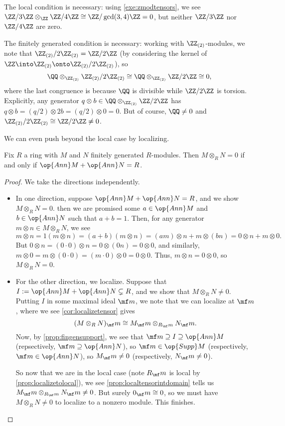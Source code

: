\begin{remark}[Nir]
	The local condition is necessary: using \autoref{exe:zmodtensors}, we see $\ZZ/3\ZZ\otimes_\ZZ\ZZ/4\ZZ\cong\ZZ/\gcd(3,4)\ZZ=0$, but neither $\ZZ/3\ZZ$ nor $\ZZ/4\ZZ$ are zero.
\end{remark}
\begin{remark}[Nir] \label{rem:fingentensordomain}
	The finitely generated condition is necessary: working with $\ZZ_{(2)}$-modules, we note that $\ZZ_{(2)}/2\ZZ_{(2)}=\ZZ/2\ZZ$ (by considering the kernel of $\ZZ\into\ZZ_{(2)}\onto\ZZ_{(2)}/2\ZZ_{(2)}$), so
	\[\QQ\otimes_{\ZZ_{(2)}}\ZZ_{(2)}/2\ZZ_{(2)}\cong\QQ\otimes_{\ZZ_{(2)}}\ZZ/2\ZZ\cong0,\]
	where the last congruence is because $\QQ$ is divisible while $\ZZ/2\ZZ$ is torsion. Explicitly, any generator $q\otimes b\in\QQ\otimes_{\ZZ_{(2)}}\ZZ/2\ZZ$ has $q\otimes b=(q/2)\otimes2b=(q/2)\otimes0=0$. But of course, $\QQ\ne0$ and $\ZZ_{(2)}/2\ZZ_{(2)}\cong\ZZ/2\ZZ\ne0$.
\end{remark}
We can even push beyond the local case by localizing.
\begin{corollary}
	Fix $R$ a ring with $M$ and $N$ finitely generated $R$-modules. Then $M\otimes_RN=0$ if and only if $\op{Ann}M+\op{Ann}N=R$.
\end{corollary}
\begin{proof}
	We take the directions independently.
	\begin{itemize}
		\item In one direction, suppose $\op{Ann}M+\op{Ann}N=R$, and we show $M\otimes_RN=0$. then we are promised some $a\in\op{Ann}M$ and $b\in\op{Ann}N$ such that $a+b=1$. Then, for any generator $m\otimes n\in M\otimes_RN$, we see
		\[m\otimes n=1(m\otimes n)=(a+b)(m\otimes n)=(am)\otimes n+m\otimes(bn)=0\otimes n+m\otimes0.\]
		But $0\otimes n=(0\cdot0)\otimes n=0\otimes(0n)=0\otimes0$, and similarly, $m\otimes0=m\otimes(0\cdot0)=(m\cdot0)\otimes0=0\otimes0$. Thus, $m\otimes n=0\otimes0$, so $M\otimes_RN=0$.
		
		\item For the other direction, we localize. Suppose that $I:=\op{Ann}M+\op{Ann}N\subsetneq R$, and we show that $M\otimes_RN\ne0$. Putting $I$ in some maximal ideal $\mf m$, we note that we can localize at $\mf m$, where we see \autoref{cor:localizetensor} gives
		\[(M\otimes_RN)_\mf m\cong M_\mf m\otimes_{R_\mf m}N_\mf m.\]
		Now, by \autoref{prop:fingensupport}, we see that $\mf m\supseteq I\supseteq\op{Ann}M$ (repsectively, $\mf m\supseteq\op{Ann}N$), so $\mf m\in\op{Supp}M$ (respectively, $\mf m\in\op{Ann}N$), so $M_\mf m\ne0$ (respectively, $N_\mf m\ne0$).

		So now that we are in the local case (note $R_\mf m$ is local by \autoref{prop:localizetolocal}), we see \autoref{prop:localtensorintdomain} tells us $M_\mf m\otimes_{R_\mf m}N_\mf m\ne0$. But surely $0_\mf m\cong 0$, so we must have $M\otimes_RN\ne0$ to localize to a nonzero module. This finishes.
		\qedhere
	\end{itemize}
\end{proof}
